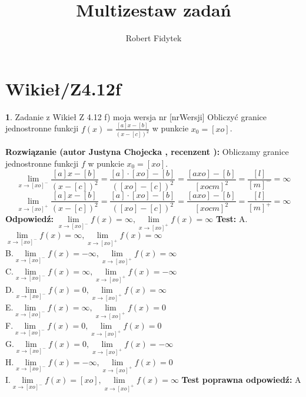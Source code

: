 \documentclass[12pt, a4paper]{article}
\title{Multizestaw zadań}
\author{Robert Fidytek}
\date{}
\theoremstyle{definition} %
\newtheorem{zad}{}
\newcommand{\kategoria}[1]{\section{#1}} %
\newcommand{\zadStart}[1]{\begin{zad}#1\newline} %
\newcommand{\zadStop}{\end{zad}}   %
\newcommand{\rozwStart}[2]{\noindent \textbf{Rozwiązanie (autor #1 , recenzent #2): }\newline} %
\newcommand{\rozwStop}{\newline}                                            %
\newcommand{\odpStart}{\noindent \textbf{Odpowiedź:}\newline}    %
\newcommand{\odpStop}{\newline}                                             %
\newcommand{\testStart}{\noindent \textbf{Test:}\newline} %
\newcommand{\testStop}{\newline} %
\newcommand{\kluczStart}{\noindent \textbf{Test poprawna odpowiedź:}\newline} %
\newcommand{\kluczStop}{\newline} %
\begin{document}
\maketitle


\kategoria{Wikieł/Z4.12f}
\zadStart{Zadanie z Wikieł Z 4.12 f) moja wersja nr [nrWersji]}
Obliczyć granice jednostronne funkcji $f(x)=\frac{[a]x-[b]}{(x-[c])^{2}}$ w punkcie $x_{0}=[xo]$. 
\zadStop
\rozwStart{Justyna Chojecka}{}
Obliczamy granice jednostronne funkcji $f$ w punkcie $x_{0}=[xo]$.
$$\lim\limits_{x\to [xo]^{-}}\frac{[a]x-[b]}{(x-[c])^{2}}=\frac{[a]\cdot [xo]-[b]}{([xo]-[c])^{2}}=\frac{[axo]-[b]}{[xocm]^{2}}=\frac{[l]}{[m]^{-}}=\infty$$
$$\lim\limits_{x\to [xo]^{+}}\frac{[a]x-[b]}{(x-[c])^{2}}=\frac{[a]\cdot [xo]-[b]}{([xo]-[c])^{2}}=\frac{[axo]-[b]}{[xocm]^{2}}=\frac{[l]}{[m]^{+}}=\infty$$
\rozwStop
\odpStart
$\lim\limits_{x\to [xo]^{-}}f(x)=\infty, \lim\limits_{x\to [xo]^{+}}f(x)=\infty$
\odpStop
\testStart
A.$\lim\limits_{x\to [xo]^{-}}f(x)=\infty, \lim\limits_{x\to [xo]^{+}}f(x)=\infty$\\
B.$\lim\limits_{x\to [xo]^{-}}f(x)=-\infty, \lim\limits_{x\to [xo]^{+}}f(x)=\infty$\\
C.$\lim\limits_{x\to [xo]^{-}}f(x)=\infty, \lim\limits_{x\to [xo]^{+}}f(x)=-\infty$\\
D.$\lim\limits_{x\to [xo]^{-}}f(x)=0, \lim\limits_{x\to [xo]^{+}}f(x)=\infty$\\
E.$\lim\limits_{x\to [xo]^{-}}f(x)=\infty, \lim\limits_{x\to [xo]^{+}}f(x)=0$\\
F.$\lim\limits_{x\to [xo]^{-}}f(x)=0, \lim\limits_{x\to [xo]^{+}}f(x)=0$\\
G.$\lim\limits_{x\to [xo]^{-}}f(x)=0, \lim\limits_{x\to [xo]^{+}}f(x)=-\infty$\\
H.$\lim\limits_{x\to [xo]^{-}}f(x)=-\infty, \lim\limits_{x\to [xo]^{+}}f(x)=0$\\
I.$\lim\limits_{x\to [xo]^{-}}f(x)=[xo], \lim\limits_{x\to [xo]^{+}}f(x)=\infty$
\testStop
\kluczStart
A
\kluczStop
\end{document}

